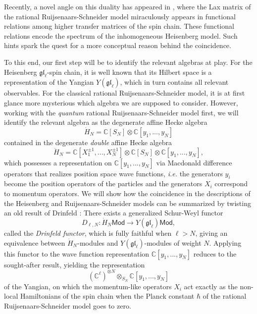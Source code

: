 \documentclass[11pt]{report}
\theoremstyle{definition}
\theoremstyle{remark}
\theoremstyle{remark}
\newcommand{\C}{\mathbb{C}}
\begin{document}
Recently, a novel angle on this duality has appeared in \cite{book:arutyunov:betheAnsatz}, where the Lax matrix of the rational Ruijsenaars-Schneider model miraculously appears in functional relations among higher transfer matrices of the spin chain. These functional relations encode the spectrum of the inhomogeneous Heisenberg model. Such hints spark the quest for a more conceptual reason behind the coincidence.

To this end, our first step will be to identify the relevant algebras at play. For the Heisenberg $\mathfrak{gl}_\ell$-spin chain, it is well known that its Hilbert space is a representation of the Yangian $Y(\mathfrak{gl}_\ell)$, which in turn contains all relevant observables. For the classical rational Ruijsenaars-Schneider model, it is at first glance more mysterious which algebra we are supposed to consider. However, working with the \emph{quantum} rational Ruijsenaars-Schneider model first, we will identify the relevant algebra as the degenerate affine Hecke algebra
\begin{equation*}
\dot H_N = \C[S_N] \otimes \C[y_1,...,y_N]
\end{equation*}
contained in the degenerate \emph{double} affine Hecke algebra
\begin{equation*}
\ddot H_N = \C[X_1^{\pm 1},...,X_N^{\pm 1}] \otimes \C[S_N] \otimes \C[y_1,...,y_N],
\end{equation*}
which possesses a representation on $\C[y_1,...,y_N]$ via Macdonald difference operators that realizes position space wave functions, \emph{i.e.} the generators $y_i$ become the position operators of the particles and the generators $X_i$ correspond to momentum operators. We will show how the coincidence in the descriptions of the Heisenberg and Ruijsenaars-Schneider models can be summarized by twisting an old result of Drinfeld \cite{article:drinfeld:1986}: There exists a generalized Schur-Weyl functor
\begin{equation*}
D_{\ell,N}: \dot H_N\mathsf{Mod} \to Y(\mathfrak{gl}_\ell)\mathsf{Mod},
\end{equation*}
called the \emph{Drinfeld functor}, which is fully faithful when $\ell > N$, giving an equivalence between $\dot H_N$-modules and $Y(\mathfrak{gl}_\ell)$-modules of weight $N$. Applying this functor to the wave function representation $\C[y_1,...,y_N]$ reduces to the sought-after result, yielding the representation
\begin{equation*}
(\C^\ell)^{\otimes N} \otimes_{S_N} \C[y_1,...,y_N]
\end{equation*}
of the Yangian, on which the momentum-like operators $X_i$ act exactly as the non-local Hamiltonians of the spin chain when the Planck constant $\hbar$ of the rational Ruijsenaars-Schneider model goes to zero.
\end{document}

